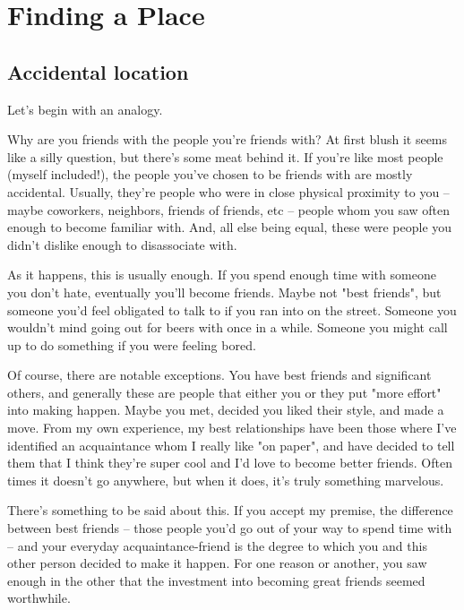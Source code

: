 \documentclass[../the-millions-of-gestures.tex]{subfiles}
\begin{document}
\chapter{Finding a Place}
\TOWRITE


\section{Accidental location}

Let's begin with an analogy.

Why are you friends with the people you're friends with? At first blush it seems
like a silly question, but there's some meat behind it. If you're like most
people (myself included!), the people you've chosen to be friends with are
mostly accidental. Usually, they're people who were in close physical proximity
to you -- maybe coworkers, neighbors, friends of friends, etc -- people whom you
saw often enough to become familiar with. And, all else being equal, these were
people you didn't dislike enough to disassociate with.

As it happens, this is usually enough. If you spend enough time with someone you
don't hate, eventually you'll become friends. Maybe not "best friends", but
someone you'd feel obligated to talk to if you ran into on the street. Someone
you wouldn't mind going out for beers with once in a while. Someone you might
call up to do something if you were feeling bored.

Of course, there are notable exceptions. You have best friends and significant
others, and generally these are people that either you or they put "more effort"
into making happen. Maybe you met, decided you liked their style, and made a
move. From my own experience, my best relationships have been those where I've
identified an acquaintance whom I really like "on paper", and have decided to
tell them that I think they're super cool and I'd love to become better friends.
Often times it doesn't go anywhere, but when it does, it's truly something
marvelous.


There's something to be said about this. If you accept my premise, the
difference between best friends -- those people you'd go out of your way to
spend time with -- and your everyday acquaintance-friend is the degree to which
you and this other person decided to make it happen. For one reason or another,
you saw enough in the other that the investment into becoming great friends
seemed worthwhile.
\end{document}
